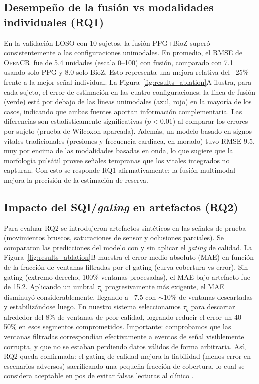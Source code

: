 \documentclass[10pt,a4paper,twocolumn]{article}
\newcommand{\OpenCR}{\textsc{OpenCR}}
\begin{document}
\subsection{Desempe\~no de la fusi\'on vs modalidades individuales (RQ1)}

En la validaci\'on LOSO con 10 sujetos, la fusi\'on PPG+BioZ super\'o consistentemente a las configuraciones unimodales. En promedio, el RMSE de \OpenCR\ fue de 5.4 unidades (escala 0--100) con fusi\'on, comparado con 7.1 usando solo PPG y 8.0 solo BioZ. Esto representa una mejora relativa del ~25\% frente a la mejor se\~nal individual. La Figura~\ref{fig:results_ablation}A ilustra, para cada sujeto, el error de estimaci\'on en las cuatro configuraciones: la l\'inea de fusi\'on (verde) est\'a por debajo de las l\'ineas unimodales (azul, rojo) en la mayor\'ia de los casos, indicando que ambas fuentes aportan informaci\'on complementaria. Las diferencias son estad\'isticamente significativas ($p<0.01$) al comparar los errores por sujeto (prueba de Wilcoxon apareada). Adem\'as, un modelo basado en signos vitales tradicionales (presiones y frecuencia cardiaca, en morado) tuvo RMSE 9.5, muy por encima de las modalidades basadas en onda, lo que sugiere que la morfolog\'ia puls\'atil provee se\~nales tempranas que los vitales integrados no capturan. Con esto se responde RQ1 afirmativamente: la fusi\'on multimodal mejora la precisi\'on de la estimaci\'on de reserva.

\subsection{Impacto del SQI/\emph{gating} en artefactos (RQ2)}

Para evaluar RQ2 se introdujeron artefactos sint\'eticos en las se\~nales de prueba (movimientos bruscos, saturaciones de sensor y oclusiones parciales). Se compararon las predicciones del modelo con y sin aplicar el \emph{gating} de calidad. La Figura~\ref{fig:results_ablation}B muestra el error medio absoluto (MAE) en funci\'on de la fracci\'on de ventanas filtradas por el gating (curva cobertura vs error). Sin gating (extremo derecho, 100\% ventanas procesadas), el MAE bajo artefacto fue de 15.2. Aplicando un umbral $\tau_q$ progresivamente m\'as exigente, el MAE disminuy\'o considerablemente, llegando a ~7.5 con $\sim$10\% de ventanas descartadas y estabiliz\'andose luego. En nuestro sistema seleccionamos $\tau_q$ para descartar alrededor del 8\% de ventanas de peor calidad, logrando reducir el error un 40--50\% en esos segmentos comprometidos. Importante: comprobamos que las ventanas filtradas correspond\'ian efectivamente a eventos de se\~nal visiblemente corrupta, y que no se estaban perdiendo datos v\'alidos de forma arbitraria. As\'i, RQ2 queda confirmada: el gating de calidad mejora la fiabilidad (menos error en escenarios adversos) sacrificando una peque\~na fracci\'on de cobertura, lo cual se considera aceptable en pos de evitar falsas lecturas al cl\'inico \cite{karim2024sqi}.
\end{document}
